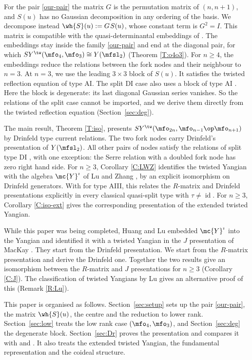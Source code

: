 \documentclass{amsart}
\numberwithin{equation}{section}
\theoremstyle{remark}
\DeclareMathOperator{\id}{id}
\renewcommand{\,}{\kern 0.1em} %
\begin{document}
For the pair \eqref{our-pair} the matrix $G$ is the permutation matrix of $(n,n+1)$, and $S(u)$
has no Gaussian decomposition in any ordering of the basis. We decompose instead $\wh{S}(u) := G\,S(u)$,
whose constant term is $G^2=I$. This matrix is compatible with the quasi-determinantal
embeddings of \cite{Re26}. The embeddings stay inside the family \eqref{our-pair} and end at the
diagonal pair, for which $SY^\tw(\mfo_4,\mfo_3)\cong Y(\mfsl_2)$ (Theorem \ref{T:o4o3}). For
$n\ge4$, the embeddings reduce the relations between the fork nodes and their neighbour to $n=3$. At
$n=3$, we use the leading $3\times3$ block of $S(u)$. It satisfies the twisted reflection equation of
type AI. The split DI case also uses a block of type AI \cite[\S5.1 and \S5.3]{Re26}. Here the block
is degenerate: its last diagonal Gaussian series vanishes. So the relations of the split case cannot be imported, and we derive them directly from
the twisted reflection equation (Section~\ref{sec:deg}).

The main result, Theorem \ref{T:iso}, presents
$SY^\tw(\mfo_{2n},\mfo_{n-1}\op\mfo_{n+1})$ by Drinfeld type current relations. The two fork nodes carry Drinfeld's presentation of $Y(\mfsl_2)$. All other pairs of nodes
satisfy the relations of split type DI \cite[Thm.~5.14]{Re26}, with one exception: the Serre
relation with a doubled fork node has zero right hand side. For $n\ge3$, Corollary \ref{C:LWZ}
identifies the twisted Yangian with the algebra $\mc{Y}^\imath$ of Lu and Zhang \cite{LZ25}, by an
explicit isomorphism on Drinfeld generators. With \cite[Thm.~B]{LZ25} for type AIII, this relates
the $R$-matrix and Drinfeld presentations explicitly in every classical quasi-split type with
$\tau\ne\id$. For $n\ge3$, Corollary \ref{C:iso-ext} gives the corresponding presentation of the extended twisted Yangian.

While this paper was being completed, Huang and Lu \cite{HL26} embedded $\mc{Y}^\imath$ into the
Yangian and identified it with a twisted Yangian in the $J$ presentation of MacKay \cite{Mac02}.
They start from the Drinfeld presentation. We start from the $R$-matrix presentation and derive
the Drinfeld one. Together the two results give an isomorphism between the $R$-matrix and $J$
presentations for $n\ge3$ (Corollary \ref{C:J}). The classification of twisted Yangians by Lu \cite{Lu26b} gives an
alternative proof of this (Remark \ref{R:Lu}).

This paper is organised as follows. Section~\ref{sec:setup} sets up the pair \eqref{our-pair},
the matrix $\wh{S}(u)$, the centre and the reduction to lower rank. Section~\ref{sec:low} treats
the low rank case $(\mfo_4,\mfo_3)$, and Section~\ref{sec:deg} the degenerate block.
Section~\ref{sec:Dr} proves the presentation and compares it with \cite{LZ25} and \cite{HL26}. It
also treats the extended twisted Yangian, the fundamental representation and the coideal
structure.
\end{document}
